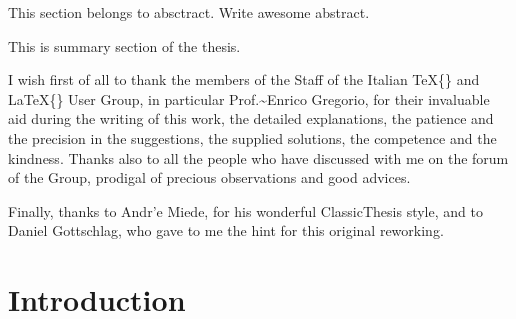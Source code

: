 \documentclass[11pt,a4paper,oneside,openright,titlepage,
  headinclude,footinclude,BCOR5mm,
  numbers=noenddot,cleardoublepage=empty,
  tablecaptionabove, dottedtoc,
  bibliography=totoc]{scrreprt}
\begin{document}
This section belongs to absctract. Write awesome abstract.
\vfill

\clearpage
{}
This is summary section of the thesis.
\endgroup
\vfill


\begingroup
\let\clearpage\relax
\let\cleardoublepage\relax
\let\cleardoublepage\relax


I wish first of all to thank the members of the Staff of the Italian \TeX\{\} and \LaTeX\{\} User Group, in particular Prof.\textasciitilde Enrico Gregorio, for their invaluable aid during the writing of this work, the detailed explanations, the patience and the precision in the suggestions, the supplied solutions, the competence and the kindness. Thanks also to all the people who have discussed with me on the forum of the Group, prodigal of precious observations and good advices.

Finally, thanks to Andr'e Miede, for his wonderful ClassicThesis style, and to Daniel Gottschlag, who gave to me the hint for this original reworking.

\endgroup

\clearpage
{}
{}
\setcounter{tocdepth}{2}
\begingroup 
  \let\clearpage\relax
  \let\cleardoublepage\relax
  \tableofcontents
\endgroup
\markboth{\spacedlowsmallcaps{\contentsname}}
{\spacedlowsmallcaps{\contentsname}} 

\begingroup 
  \let\clearpage\relax
  \let\cleardoublepage\relax
\endgroup

\cleardoublepage


\hypertarget{introduction}{%
\chapter{Introduction}\label{introduction}}
\end{document}
